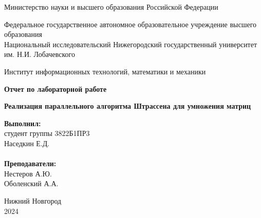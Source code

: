 \documentclass{report}
\begin{document}
\begin{titlepage}

\begin{center}
Министерство науки и высшего образования Российской Федерации
\end{center}

\begin{center}
Федеральное государственное автономное образовательное учреждение высшего образования \\
Национальный исследовательский Нижегородский государственный университет им. Н.И. Лобачевского
\end{center}

\begin{center}
Институт информационных технологий, математики и механики
\end{center}

\vspace{4em}

\begin{center}
\textbf{\Large Отчет по лабораторной работе} \\
\end{center}
\begin{center}
\textbf{\Large \«Реализация параллельного алгоритма Штрассена для умножения матриц\»} \\
\end{center}

\vspace{4em}

\newbox{\lbox}
\newlength{\maxl}
\setlength{\maxl}{\wd\lbox}
\hfill\parbox{7cm}{
\hspace*{5cm}\hspace*{-5cm}\textbf{Выполнил:} \\
студент группы 3822Б1ПР3 \\
Наседкин Е.Д.\\
\\
\hspace*{5cm}\hspace*{-5cm}\textbf{Преподаватели:} \\
Нестеров А.Ю.\\
Оболенский А.А.\\}
\vspace{\fill}

\begin{center} Нижний Новгород \\ 2024 \end{center}

\end{titlepage}
\end{document}
